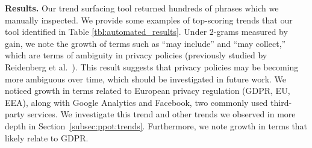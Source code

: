 \begin{table}[]
\centering
{}
\caption{The top five results from three categories of our automated trend surfacing tool. Scoring functions: ``gain,'' is the difference between the lowest and highest frequency; ``pos slope 2,'' is the maximum slope over any two intervals.}
\label{tbl:automated_results}
\end{table}

\textbf{Results.} Our trend surfacing tool returned hundreds of phrases which we manually inspected. 
We provide some examples of top-scoring trends that our tool identified in Table \ref{tbl:automated_results}. Under 2-grams measured by gain, we note the growth of terms such as ``may include'' and ``may collect,'' which are terms of ambiguity in privacy policies (previously studied by Reidenberg et al.~\cite{reidenberg2016ambiguity}). This result suggests that privacy policies may be becoming more ambiguous over time, which should be investigated in future work. We noticed growth in terms related to European privacy regulation (GDPR, EU, EEA), along with Google Analytics and Facebook, two commonly used third-party services. We investigate this trend and other trends we observed in more depth in Section~\ref{subsec:ppot:trends}. Furthermore, we note growth in terms that likely relate to GDPR.


